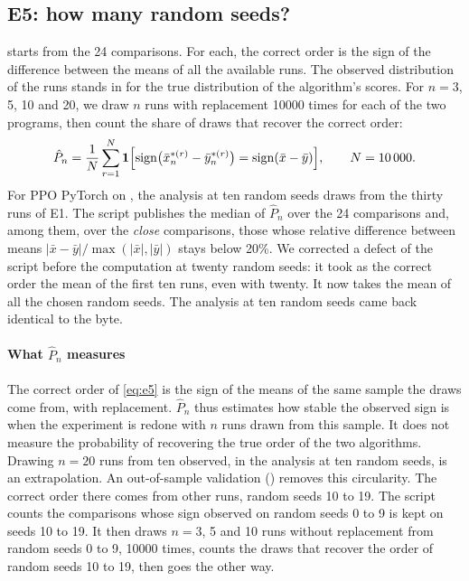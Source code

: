 \subsection{E5: how many random seeds?}\label{sec:plan-e5}
 starts from the 24 comparisons. For each, the correct order is the sign of the
difference between the means of all the available runs. The observed distribution of the runs stands in for
the true distribution of the algorithm's scores. For $n=3$, 5, 10 and 20, we draw $n$ runs with replacement
\num{10000} times for each of the two programs, then count the share of draws that recover the correct order:
\begin{equation}\label{eq:e5}
  \hat P_n=\frac{1}{N}\sum_{r=1}^{N}\mathbf{1}\Bigl[\operatorname{sign}\bigl(\bar x^{*(r)}_n-\bar y^{*(r)}_n\bigr)
  =\operatorname{sign}(\bar x-\bar y)\Bigr],\qquad N=\num{10000}.
\end{equation}
For PPO PyTorch on , the analysis at ten random seeds draws from the thirty runs of E1. The script
publishes the median of $\hat P_n$ over the 24 comparisons and, among them, over the \emph{close} comparisons,
those whose relative difference between means $|\bar x-\bar y|/\max(|\bar x|,|\bar y|)$ stays below 20\%. We corrected a
defect of the script before the computation at twenty random seeds: it took as the correct order the mean of the first ten
runs, even with twenty. It now takes the mean of all the chosen random seeds. The analysis at ten random seeds came
back identical to the byte.

\paragraph{What $\hat P_n$ measures}
The correct order of \cref{eq:e5} is the sign of the means of the same sample the draws come from, with
replacement. $\hat P_n$ thus estimates how stable the observed sign is when the experiment is redone with $n$
runs drawn from this sample. It does not measure the probability of recovering the true order of the two
algorithms. Drawing $n=20$ runs from ten observed, in the analysis at ten random seeds, is an extrapolation.
An out-of-sample validation () removes this circularity.
The correct order there comes from other runs, random seeds 10 to 19. The script counts the comparisons whose
sign observed on random seeds 0 to 9 is kept on seeds 10 to 19. It then draws $n=3$, 5 and 10 runs without
replacement from random seeds 0 to 9, \num{10000} times, counts the draws that recover the order of random
seeds 10 to 19, then goes the other way.

